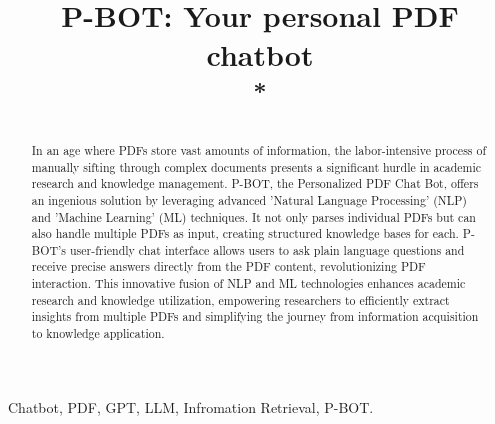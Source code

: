 \documentclass[conference]{IEEEtran}
\begin{document}
\title{P-BOT: Your personal PDF chatbot\\
{\footnotesize \textsuperscript{*}}
}

\author{
\and
{}
\and
{}
\and
{}
}

\maketitle

\begin{abstract}
In an age where PDFs store vast amounts of information, the labor-intensive process of manually sifting through complex documents presents a significant hurdle in academic research and knowledge management. P-BOT, the Personalized PDF Chat Bot, offers an ingenious solution by leveraging advanced 'Natural Language Processing' (NLP) and 'Machine Learning' (ML) techniques. It not only parses individual PDFs but can also handle multiple PDFs as input, creating structured knowledge bases for each. P-BOT's user-friendly chat interface allows users to ask plain language questions and receive precise answers directly from the PDF content, revolutionizing PDF interaction. This innovative fusion of NLP and ML technologies enhances academic research and knowledge utilization, empowering researchers to efficiently extract insights from multiple PDFs and simplifying the journey from information acquisition to knowledge application.
\end{abstract}
\baselineskip
\begin{IEEEkeywords}
Chatbot, PDF, GPT, LLM, Infromation Retrieval, P-BOT.
\end{IEEEkeywords}
\end{document}
